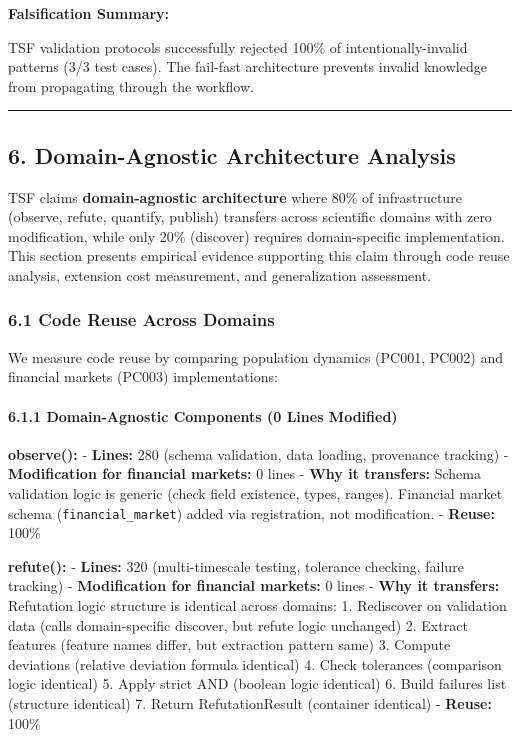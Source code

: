\documentclass[
]{article}
\begin{document}
\textbf{Falsification Summary:}

TSF validation protocols successfully rejected 100\% of
intentionally-invalid patterns (3/3 test cases). The fail-fast
architecture prevents invalid knowledge from propagating through the
workflow.

\begin{center}\rule{0.5\linewidth}{0.5pt}\end{center}

\subsection{6. Domain-Agnostic Architecture
Analysis}\label{domain-agnostic-architecture-analysis}

TSF claims \textbf{domain-agnostic architecture} where 80\% of
infrastructure (observe, refute, quantify, publish) transfers across
scientific domains with zero modification, while only 20\% (discover)
requires domain-specific implementation. This section presents empirical
evidence supporting this claim through code reuse analysis, extension
cost measurement, and generalization assessment.

\subsubsection{6.1 Code Reuse Across
Domains}\label{code-reuse-across-domains}

We measure code reuse by comparing population dynamics (PC001, PC002)
and financial markets (PC003) implementations:

\paragraph{6.1.1 Domain-Agnostic Components (0 Lines
Modified)}\label{domain-agnostic-components-0-lines-modified}

\textbf{observe():} - \textbf{Lines:} 280 (schema validation, data
loading, provenance tracking) - \textbf{Modification for financial
markets:} 0 lines - \textbf{Why it transfers:} Schema validation logic
is generic (check field existence, types, ranges). Financial market
schema (\texttt{financial\_market}) added via registration, not
modification. - \textbf{Reuse:} 100\%

\textbf{refute():} - \textbf{Lines:} 320 (multi-timescale testing,
tolerance checking, failure tracking) - \textbf{Modification for
financial markets:} 0 lines - \textbf{Why it transfers:} Refutation
logic structure is identical across domains: 1. Rediscover on validation
data (calls domain-specific discover, but refute logic unchanged) 2.
Extract features (feature names differ, but extraction pattern same) 3.
Compute deviations (relative deviation formula identical) 4. Check
tolerances (comparison logic identical) 5. Apply strict AND (boolean
logic identical) 6. Build failures list (structure identical) 7. Return
RefutationResult (container identical) - \textbf{Reuse:} 100\%
\end{document}

